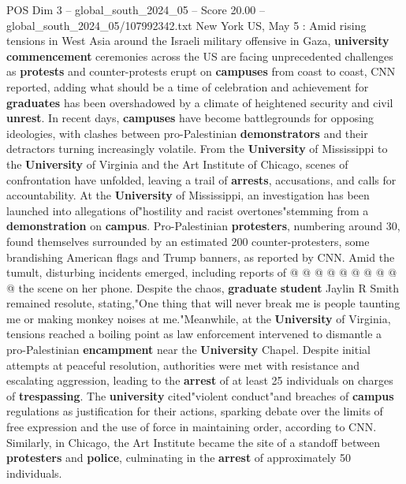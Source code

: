 \begin{textsample}{POS Dim 3 – global\_south\_2024\_05 – Score 20.00 – global\_south\_2024\_05/107992342.txt}  \label{ex:f3_pos_110}
New York US, May 5 : Amid rising tensions in West Asia around the Israeli military offensive in Gaza, \textbf{university} \textbf{commencement} ceremonies across the US are facing unprecedented challenges as \textbf{protests} and counter-protests erupt on \textbf{campuses} from coast to coast, CNN reported, adding what should be a time of celebration and achievement for \textbf{graduates} has been overshadowed by a climate of heightened security and civil \textbf{unrest}.
In recent days, \textbf{campuses} have become battlegrounds for opposing ideologies, with clashes between pro-Palestinian \textbf{demonstrators} and their detractors turning increasingly volatile.
From the \textbf{University} of Mississippi to the \textbf{University} of Virginia and the Art Institute of Chicago, scenes of confrontation have unfolded, leaving a trail of \textbf{arrests}, accusations, and calls for accountability.
At the \textbf{University} of Mississippi, an investigation has been launched into allegations of"hostility and racist overtones"stemming from a \textbf{demonstration} on \textbf{campus}.
Pro-Palestinian \textbf{protesters}, numbering around 30, found themselves surrounded by an estimated 200 counter-protesters, some brandishing American flags and Trump banners, as reported by CNN.
Amid the tumult, disturbing incidents emerged, including reports of @ @ @ @ @ @ @ @ @ @ the scene on her phone.
Despite the chaos, \textbf{graduate} \textbf{student} Jaylin R Smith remained resolute, stating,"One thing that will never break me is people taunting me or making monkey noises at me."Meanwhile, at the \textbf{University} of Virginia, tensions reached a boiling point as law enforcement intervened to dismantle a pro-Palestinian \textbf{encampment} near the \textbf{University} Chapel.
Despite initial attempts at peaceful resolution, authorities were met with resistance and escalating aggression, leading to the \textbf{arrest} of at least 25 individuals on charges of \textbf{trespassing}.
The \textbf{university} cited"violent conduct"and breaches of \textbf{campus} regulations as justification for their actions, sparking debate over the limits of free expression and the use of force in maintaining order, according to CNN.
Similarly, in Chicago, the Art Institute became the site of a standoff between \textbf{protesters} and \textbf{police}, culminating in the \textbf{arrest} of approximately 50 individuals.

\end{textsample}
